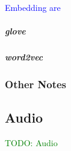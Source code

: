 



\textcolor{blue}{Embedding are }

\subparagraph{glove}


\subparagraph{word2vec}


\subsubsection{Other Notes}


\subsection{Audio}


\textcolor{green}{TODO: Audio}

